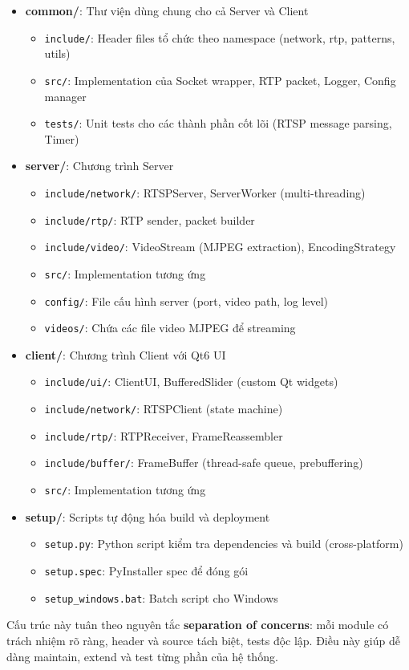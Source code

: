 \begin{itemize}
    \item \textbf{common/}: Thư viện dùng chung cho cả Server và Client
    \begin{itemize}
        \item \texttt{include/}: Header files tổ chức theo namespace (network, rtp, patterns, utils)
        \item \texttt{src/}: Implementation của Socket wrapper, RTP packet, Logger, Config manager
        \item \texttt{tests/}: Unit tests cho các thành phần cốt lõi (RTSP message parsing, Timer)
    \end{itemize}
    
    \item \textbf{server/}: Chương trình Server
    \begin{itemize}
        \item \texttt{include/network/}: RTSPServer, ServerWorker (multi-threading)
        \item \texttt{include/rtp/}: RTP sender, packet builder
        \item \texttt{include/video/}: VideoStream (MJPEG extraction), EncodingStrategy
        \item \texttt{src/}: Implementation tương ứng
        \item \texttt{config/}: File cấu hình server (port, video path, log level)
        \item \texttt{videos/}: Chứa các file video MJPEG để streaming
    \end{itemize}
    
    \item \textbf{client/}: Chương trình Client với Qt6 UI
    \begin{itemize}
        \item \texttt{include/ui/}: ClientUI, BufferedSlider (custom Qt widgets)
        \item \texttt{include/network/}: RTSPClient (state machine)
        \item \texttt{include/rtp/}: RTPReceiver, FrameReassembler
        \item \texttt{include/buffer/}: FrameBuffer (thread-safe queue, prebuffering)
        \item \texttt{src/}: Implementation tương ứng
    \end{itemize}
    
    \item \textbf{setup/}: Scripts tự động hóa build và deployment
    \begin{itemize}
        \item \texttt{setup.py}: Python script kiểm tra dependencies và build (cross-platform)
        \item \texttt{setup.spec}: PyInstaller spec để đóng gói
        \item \texttt{setup\_windows.bat}: Batch script cho Windows
    \end{itemize}
\end{itemize}

Cấu trúc này tuân theo nguyên tắc \textbf{separation of concerns}: mỗi module có trách nhiệm rõ ràng, header và source tách biệt, tests độc lập. Điều này giúp dễ dàng maintain, extend và test từng phần của hệ thống.
